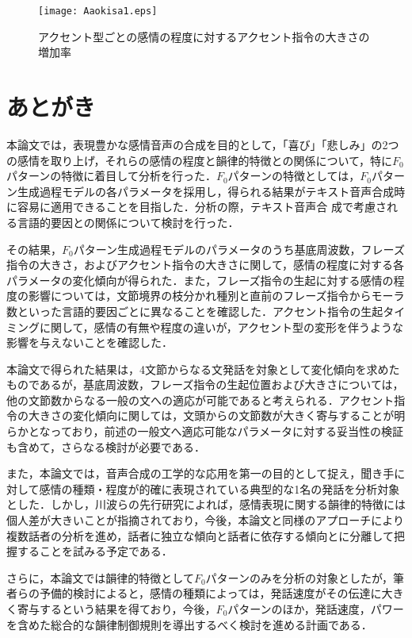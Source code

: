 \documentclass[japanese]{jnlp_1.3b}
\begin{document}
\begin{figure}[t]
\begin{center}
    \texttt{[image: Aaokisa1.eps]}
\end{center}
\caption{アクセント型ごとの感情の程度に対するアクセント指令の大きさの増加率}
\label{Aakekka1}
\end{figure}

\section{あとがき}\label{sa}
本論文では，表現豊かな感情音声の合成を目的として，「喜び」「悲しみ」の2つの感情を取り上げ，それらの感情の程度と韻律的特徴との関係について，特に$F_0$パターンの特徴に着目して分析を行った．$F_0$パターンの特徴としては，$F_0$パターン生成過程モデルの各パラメータを採用し，得られる結果がテキスト音声合成時に容易に適用できることを目指した．分析の際，テキスト音声合
成で考慮される言語的要因との関係について検討を行った．

その結果，$F_0$パターン生成過程モデルのパラメータのうち基底周波数，フレーズ指令の大きさ，およびアクセント指令の大きさに関して，感情の程度に対する各パラメータの変化傾向が得られた．また，フレーズ指令の生起に対する感情の程度の影響については，文節境界の枝分かれ種別と直前のフレーズ指令からモーラ数といった言語的要因ごとに異なることを確認した．アクセント指令の生起タイミングに関して，感情の有無や程度の違いが，アクセント型の変形を伴うような影響を与えないことを確認した．

本論文で得られた結果は，4文節からなる文発話を対象として変化傾向を求めたものであるが，基底周波数，フレーズ指令の生起位置および大きさについては，他の文節数からなる一般の文への適応が可能であると考えられる．アクセント指令の大きさの変化傾向に関しては，文頭からの文節数が大きく寄与することが明らかとなっており，前述の一般文へ適応可能なパラメータに対する妥当性の検証も含めて，さらなる検討が必要である．

また，本論文では，音声合成の工学的な応用を第一の目的として捉え，聞き手に対して感情の種類・程度が的確に表現されている典型的な1名の発話を分析対象とした．しかし，川波らの先行研究\cite{Kawana}によれば，感情表現に関する韻律的特徴には個人差が大きいことが指摘されており，今後，本論文と同様のアプローチにより複数話者の分析を進め，話者に独立な傾向と話者に依存する傾向とに分離して把握することを試みる予定である．

さらに，本論文では韻律的特徴として$F_0$パターンのみを分析の対象としたが，筆者らの予備的検討によると，感情の種類によっては，発話速度がその伝達に大きく寄与するという結果を得ており，今後，$F_0$パターンのほか，発話速度，パワーを含めた総合的な韻律制御規則を導出するべく検討を進める計画である．
\end{document}
